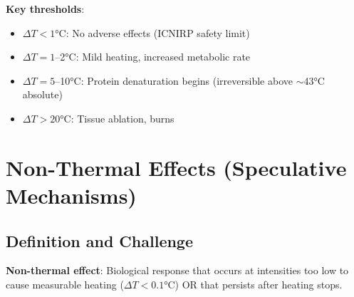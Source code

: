 \textbf{Key thresholds}:
\begin{itemize}
\item $\Delta T < 1°$C: No adverse effects (ICNIRP safety limit)
\item $\Delta T = 1$--2°C: Mild heating, increased metabolic rate
\item $\Delta T = 5$--10°C: Protein denaturation begins (irreversible above $\sim$43°C absolute)
\item $\Delta T > 20°$C: Tissue ablation, burns
\end{itemize}

\section{Non-Thermal Effects (Speculative Mechanisms)}

\subsection{Definition and Challenge}

\textbf{Non-thermal effect}: Biological response that occurs at intensities too low to cause measurable heating ($\Delta T < 0.1°$C) OR that persists after heating stops.

